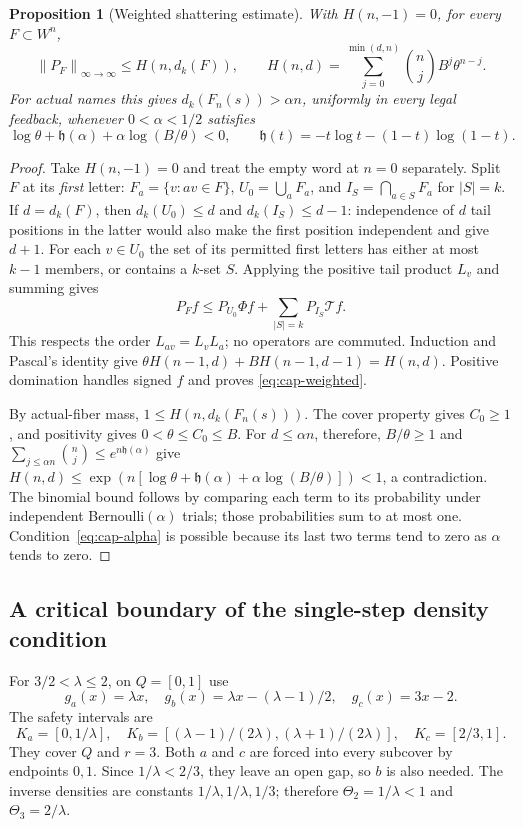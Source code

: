 \documentclass[11pt,reqno]{amsart}
\numberwithin{equation}{section}
\newtheorem{proposition}[theorem]{Proposition}
\theoremstyle{definition}
\theoremstyle{definition}
\newcommand{\opnorm}[1]{\left\|#1\right\|_{\infty\to\infty}}
\begin{document}
\begin{proposition}[Weighted shattering estimate]\label{prop:weighted-sauer}
With $H(n,-1)=0$, for every $F\subset W^n$,
\begin{equation}\label{eq:cap-weighted}
 \opnorm{P_F}\le
 H(n,d_k(F)),\qquad
 H(n,d)=\sum_{j=0}^{\min(d,n)}\binom nj B^j\theta^{n-j}.
\end{equation}
For actual names this gives $d_k(F_n(s))>\alpha n$, uniformly in
every legal feedback, whenever $0<\alpha<1/2$ satisfies
\begin{equation}\label{eq:cap-alpha}
 \log\theta+\mathfrak h(\alpha)+\alpha\log(B/\theta)<0,
 \qquad\mathfrak h(t)=-t\log t-(1-t)\log(1-t).
\end{equation}
\end{proposition}
\begin{proof}
Take $H(n,-1)=0$ and treat the empty word at $n=0$ separately.
Split $F$ at its \emph{first} letter: $F_a=\{v:av\in F\}$,
$U_0=\bigcup_aF_a$, and $I_S=\bigcap_{a\in S}F_a$ for
$|S|=k$. If $d=d_k(F)$, then $d_k(U_0)\le d$ and
$d_k(I_S)\le d-1$: independence of $d$ tail positions in the latter
would also make the first position independent and give $d+1$.
For each $v\in U_0$ the set of its permitted first letters has
either at most $k-1$ members, or contains a $k$-set $S$. Applying
the positive tail product $L_v$ and summing gives
\[
 P_F f\le P_{U_0}\Phi f+\sum_{|S|=k}P_{I_S}\mathcal T f.
\]
This respects the order $L_{av}=L_vL_a$; no operators are
commuted. Induction and Pascal's identity give
$\theta H(n-1,d)+BH(n-1,d-1)=H(n,d)$. Positive domination
handles signed $f$ and proves \eqref{eq:cap-weighted}.

By actual-fiber mass, $1\le H(n,d_k(F_n(s)))$.
The cover property gives $C_0\ge1$, and positivity gives
$0<\theta\le C_0\le B$. For $d\le\alpha n$, therefore,
$B/\theta\ge1$ and
$\sum_{j\le\alpha n}\binom nj\le e^{n\mathfrak h(\alpha)}$
give
$H(n,d)\le\exp(n[\log\theta+\mathfrak h(\alpha)+
\alpha\log(B/\theta)])<1$, a contradiction.
The binomial bound follows by comparing each term to its probability
under independent Bernoulli$(\alpha)$ trials; those probabilities
sum to at most one. Condition~\eqref{eq:cap-alpha} is possible
because its last two terms tend to zero as $\alpha$ tends to zero.
\end{proof}

\subsection{A critical boundary of the single-step density condition}
For $3/2<\lambda\le2$, on $Q=[0,1]$ use
\[
 g_a(x)=\lambda x,\quad
 g_b(x)=\lambda x-(\lambda-1)/2,\quad
 g_c(x)=3x-2.
\]
The safety intervals are
\[
 K_a=[0,1/\lambda],\quad
 K_b=[(\lambda-1)/(2\lambda),(\lambda+1)/(2\lambda)],
 \quad K_c=[2/3,1].
\]
They cover $Q$ and $r=3$. Both $a$ and $c$ are forced into
every subcover by endpoints $0,1$. Since $1/\lambda<2/3$,
they leave an open gap, so $b$ is also needed. The inverse
densities are constants $1/\lambda,1/\lambda,1/3$; therefore
$\Theta_2=1/\lambda<1$ and $\Theta_3=2/\lambda$.
\end{document}
